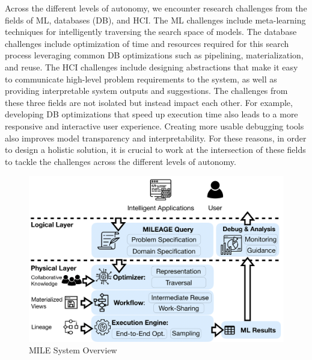 \documentclass[11pt,dvipdfmx]{article}
\newcommand{\system}{{\sf MILE}\xspace}
\begin{document}
\par Across the different levels of autonomy, we encounter research challenges from the fields of ML, databases (DB), and HCI. The ML challenges include meta-learning techniques for intelligently traversing the search space of models. The database challenges include optimization of time and resources required for this search process leveraging common DB optimizations such as pipelining, materialization, and reuse. The HCI challenges include designing abstractions that make it easy to communicate high-level problem requirements to the system, as well as providing interpretable system outputs and suggestions. The challenges from these three fields are not isolated but instead impact each other. For example, developing DB optimizations that speed up execution time also leads to a more responsive and interactive user experience. Creating more usable debugging tools also improves model transparency and interpretability. For these reasons, in order to design a holistic solution, it is crucial to work at the intersection of these fields to tackle the challenges across the different levels of autonomy.


\begin{figure}
\vspace{-10pt}
    \centering
    \includegraphics[width=\linewidth]{figs/architecture.png}
    \vspace{-20pt}
    \caption{\system System Overview}
    \label{fig:architecture}
    \vspace{-15pt}
\end{figure}
\end{document}
